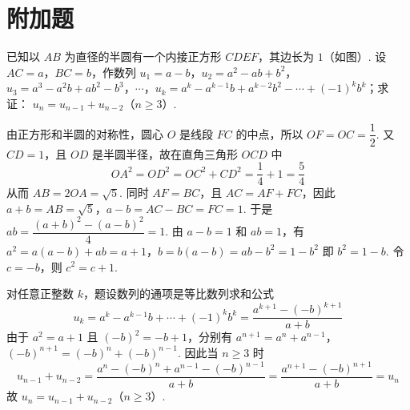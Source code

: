 \section{附加题}

\begin{problem}
已知以 \(AB\) 为直径的半圆有一个内接正方形 \(CDEF\)，其边长为 \(1\)（如图）. 设 \(AC = a\)，\(BC = b\)，作数列 \(u_1 = a - b\)，\(u_2 = a^2 - ab + b^2\)，\(u_3 = a^3 - a^2b + ab^2 - b^3\)，\(\cdots\)，\(u_k = a^k - a^{k-1}b + a^{k-2}b^2 - \cdots + (-1)^k b^k\)；求证： \(u_n = u_{n-1} + u_{n-2}\)（\(n \geqslant 3\)）.

\end{problem}

\begin{solution}
由正方形和半圆的对称性，圆心 \(O\) 是线段 \(FC\) 的中点，所以 \(OF=OC=\dfrac12\). 又 \(CD=1\)，且 \(OD\) 是半圆半径，故在直角三角形 \(OCD\) 中
\[
OA^2=OD^2=OC^2+CD^2=\frac14+1=\frac54
\]
从而 \(AB=2OA=\sqrt5\). 同时 \(AF=BC\)，且 \(AC=AF+FC\)，因此
\(a+b=AB=\sqrt5\)，\(a-b=AC-BC=FC=1\).
于是 \(ab=\dfrac{(a+b)^2-(a-b)^2}{4}=1\). 由 \(a-b=1\) 和 \(ab=1\)，有
\(a^2=a(a-b)+ab=a+1\)，\(b=b(a-b)=ab-b^2=1-b^2\)
即 \(b^2=1-b\). 令 \(c=-b\)，则 \(c^2=c+1\).

对任意正整数 \(k\)，题设数列的通项是等比数列求和公式
\[
u_k=a^k-a^{k-1}b+\cdots+(-1)^kb^k
=\frac{a^{k+1}-(-b)^{k+1}}{a+b}
\]
由于 \(a^2=a+1\) 且 \((-b)^2=-b+1\)，分别有
\(a^{n+1}=a^n+a^{n-1}\)，\((-b)^{n+1}=(-b)^n+(-b)^{n-1}\).
因此当 \(n\geqslant3\) 时
\[
u_{n-1}+u_{n-2}
=\frac{a^n-(-b)^n+a^{n-1}-(-b)^{n-1}}{a+b}
=\frac{a^{n+1}-(-b)^{n+1}}{a+b}
=u_n
\]
故 \(u_n=u_{n-1}+u_{n-2}\)（\(n\geqslant3\)）.
\end{solution}
